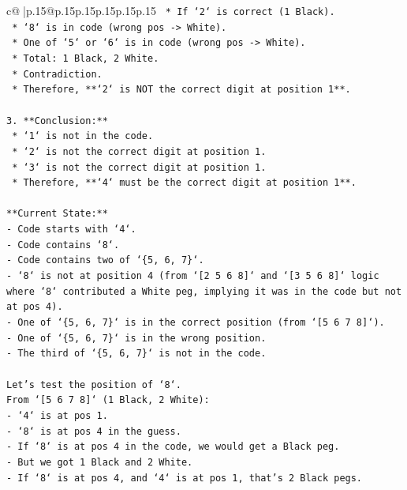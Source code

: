 \documentclass{article}
\begin{document}
{\begin{supertabular}{c@{$\;$}|p{.15\linewidth}@{}p{.15\linewidth}p{.15\linewidth}p{.15\linewidth}p{.15\linewidth}p{.15\linewidth}}
{{{\texttt{    *   If `2` is correct (1 Black).} \\
\texttt{    *   `8` is in code (wrong pos {-}> White).} \\
\texttt{    *   One of `5` or `6` is in code (wrong pos {-}> White).} \\
\texttt{    *   Total: 1 Black, 2 White.} \\
\texttt{    *   Contradiction.} \\
\texttt{    *   Therefore, **`2` is NOT the correct digit at position 1**.} \\
\\ 
\texttt{3.  **Conclusion:**} \\
\texttt{    *   `1` is not in the code.} \\
\texttt{    *   `2` is not the correct digit at position 1.} \\
\texttt{    *   `3` is not the correct digit at position 1.} \\
\texttt{    *   Therefore, **`4` must be the correct digit at position 1**.} \\
\\ 
\texttt{**Current State:**} \\
\texttt{{-} Code starts with `4`.} \\
\texttt{{-} Code contains `8`.} \\
\texttt{{-} Code contains two of `\{5, 6, 7\}`.} \\
\texttt{{-} `8` is not at position 4 (from `{[}2 5 6 8{]}` and `{[}3 5 6 8{]}` logic where `8` contributed a White peg, implying it was in the code but not at pos 4).} \\
\texttt{{-} One of `\{5, 6, 7\}` is in the correct position (from `{[}5 6 7 8{]}`).} \\
\texttt{{-} One of `\{5, 6, 7\}` is in the wrong position.} \\
\texttt{{-} The third of `\{5, 6, 7\}` is not in the code.} \\
\\ 
\texttt{Let's test the position of `8`.} \\
\texttt{From `{[}5 6 7 8{]}` (1 Black, 2 White):} \\
\texttt{{-} `4` is at pos 1.} \\
\texttt{{-} `8` is at pos 4 in the guess.} \\
\texttt{{-} If `8` is at pos 4 in the code, we would get a Black peg.} \\
\texttt{{-} But we got 1 Black and 2 White.} \\
\texttt{{-} If `8` is at pos 4, and `4` is at pos 1, that's 2 Black pegs.} \\
}}}
\end{supertabular}}
\end{document}
